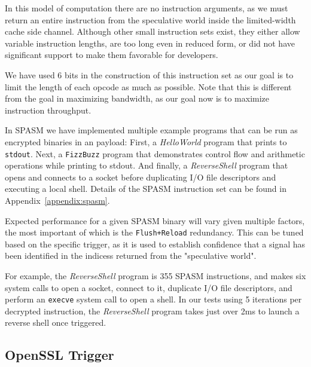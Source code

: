 In this model of computation there are no instruction arguments, as we must
return an entire instruction from the speculative world inside the limited-width
cache side channel. Although other small
instruction sets exist, they either allow variable instruction
lengths, are too long even in reduced form, or did not have significant support
to make them favorable for developers.

We have used 6 bits in the construction of this instruction set as our
goal is to limit the length of each opcode as much as possible. Note that this
is different from the goal in maximizing bandwidth, as our goal now is to
maximize instruction throughput.

In SPASM we have implemented multiple example programs that can be run as
encrypted binaries in an \speculake payload: First, a \textit{HelloWorld}
program that prints to \texttt{stdout}. Next, a \texttt{FizzBuzz} program that
demonstrates control flow and arithmetic operations while printing to stdout.
And finally, a \textit{ReverseShell} program that opens and connects to a socket
before  duplicating I/O file descriptors and executing a local shell. Details of
the SPASM instruction set can be found in Appendix~\ref{appendix:spasm}.

Expected performance for a given SPASM binary will vary given multiple factors, 
the most important of which is the \texttt{Flush+Reload} redundancy. This can be tuned
based on the specific trigger, as it is used to establish confidence that a signal 
has been identified in the indicess returned from the "speculative world". 


For example, the \textit{ReverseShell} program is 355 SPASM instructions, and
makes six system calls to open a socket,
connect to it, duplicate I/O file descriptors, and perform an \texttt{execve}
system call to open a shell.
In our tests using 5 iterations per decrypted instruction, the
\textit{ReverseShell} program takes just over 2ms to launch a reverse shell
once triggered.


\FigSpasmModel

\subsection{OpenSSL Trigger}
\label{subsec:openssl}

